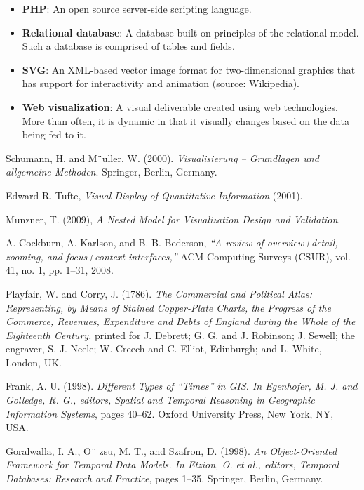 \documentclass[12pt]{article}
\begin{document}
\begin{itemize}
\item[] \textbf{PHP}: An open source server-side scripting language.
\item[] \textbf{Relational database}: A database built on principles of the relational model. Such a database is comprised of tables and fields.
\item[] \textbf{SVG}: An XML-based vector image format for two-dimensional graphics that has support for interactivity and animation (source: Wikipedia).
\item[] \textbf{Web visualization}: A visual deliverable created using web technologies. More than often, it is dynamic in that it visually changes based on the data being fed to it. 
\end{itemize}

\vfill

\begin{thebibliography}{1}

   Schumann, H. and M¨uller, W. (2000). {\em Visualisierung – Grundlagen und allgemeine Methoden}. Springer, Berlin, Germany.

    Edward R. Tufte, {\em Visual Display of Quantitative Information} (2001).

   Munzner, T. (2009), {\em A Nested Model for Visualization Design and Validation}.

   A. Cockburn, A. Karlson, and B. B. Bederson, {\em “A review of overview+detail, zooming, and focus+context interfaces,”} ACM Computing Surveys (CSUR), vol. 41, no. 1, pp. 1–31, 2008.
  
   Playfair, W. and Corry, J. (1786). {\em The Commercial and Political Atlas: Representing, by Means of Stained Copper-Plate Charts, the Progress of the Commerce, Revenues, Expenditure and Debts of England during the Whole of the Eighteenth Century.} printed for J. Debrett; G. G. and J. Robinson; J. Sewell; the engraver, S. J. Neele; W. Creech and C. Elliot, Edinburgh; and L. White, London, UK.
  
   Frank, A. U. (1998). {\em Different Types of “Times” in GIS. In Egenhofer, M. J. and Golledge, R. G., editors, Spatial and Temporal Reasoning in Geographic Information Systems}, pages 40–62. Oxford University Press, New York, NY, USA.
  
   Goralwalla, I. A., O¨ zsu, M. T., and Szafron, D. (1998). {\em An Object-Oriented Framework for Temporal Data Models. In Etzion, O. et al., editors, Temporal Databases: Research and Practice}, pages 1–35. Springer, Berlin, Germany.
  

\end{thebibliography}
\end{document}
